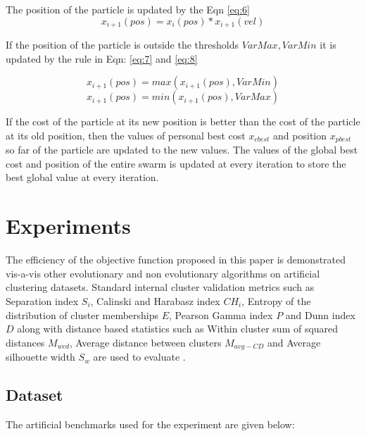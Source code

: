 \documentclass[conference]{IEEEtran}
\begin{document}
 The position of the particle is updated by the Eqn \ref{eq:6}
   \begin{equation}\label{eq:6}
  x_{i+1}(pos) = x_{i}(pos) * x_{i+1}(vel)
  \end{equation}
  
  If the position of the particle is outside the thresholds $VarMax, VarMin$ it is updated by the rule in Eqn: \ref{eq:7} and \ref{eq:8}
  
    \begin{equation}\label{eq:7}
  x_{i+1}(pos) = max(x_{i+1}(pos), VarMin)
  \end{equation}
   \begin{equation}\label{eq:8}
  x_{i+1}(pos) = min(x_{i+1}(pos), VarMax)  
  \end{equation}
  
If the cost of the particle at its new position is better than the cost of the particle at its old position, then the values of personal best cost $x_{cbest}$ and position $x_{pbest}$ so far of the particle are updated to the new values. The values of the global best cost and position of the entire swarm is updated at every iteration to store the best global value at every iteration.

 
\section{Experiments}

The efficiency of the objective function proposed in this paper is demonstrated vis-a-vis other evolutionary and non evolutionary algorithms on artificial clustering datasets. Standard internal cluster validation metrics such as Separation index $S_i$, Calinski and Harabasz index $CH_i$, Entropy of the distribution of cluster memberships $E$, Pearson Gamma index $P$ and Dunn index $D$ along with distance based statistics such as Within cluster sum of squared distances $M_{wcd}$, Average distance between clusters $M_{avg-CD}$ and Average silhouette width $S_w$  are used to evaluate \cite{val1} \cite{val2}.

\subsection{Dataset}
The artificial benchmarks used for the experiment are given below:
\end{document}
